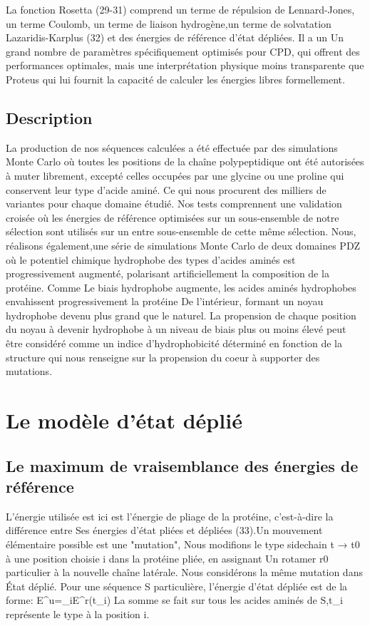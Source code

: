 La fonction Rosetta (29-31) comprend un terme de répulsion de Lennard-Jones, un terme Coulomb, un terme de liaison hydrogène,un terme de solvatation Lazaridis-Karplus (32) et des énergies de référence d'état dépliées. Il a un
Un grand nombre de paramètres spécifiquement optimisés pour CPD, qui offrent des performances optimales, mais une interprétation physique moins transparente que Proteus qui lui fournit la capacité de calculer les énergies libres formellement.

\subsection{Description}
La production de nos séquences calculées a été effectuée par des simulations Monte Carlo où toutes les positions de la chaîne polypeptidique ont été autorisées à muter librement, excepté celles occupées par une glycine ou une proline qui conservent leur type d'acide aminé. Ce qui nous procurent des milliers de variantes pour chaque domaine étudié. Nos tests comprennent une validation croisée où les énergies de référence optimisées sur un sous-ensemble de notre sélection sont utilisés sur un entre sous-ensemble de cette même sélection. Nous, réalisons également,une série de simulations Monte Carlo de deux domaines PDZ où le potentiel chimique hydrophobe des types d'acides aminés est progressivement augmenté, polarisant artificiellement la composition de la protéine. Comme Le biais hydrophobe augmente, les acides aminés hydrophobes envahissent progressivement  la protéine
De l'intérieur, formant un noyau hydrophobe devenu plus grand que le naturel.
La propension de chaque position du noyau à devenir hydrophobe à un niveau de biais plus ou moins élevé peut être considéré comme un indice d'hydrophobicité déterminé en fonction de la structure qui nous renseigne sur la propension du coeur à supporter des mutations.

\section{Le modèle d'état déplié}
\subsection{Le maximum de vraisemblance des énergies de référence}

L'énergie utilisée est ici est l'énergie de pliage de la protéine, c'est-à-dire la différence entre
Ses énergies d'état pliées et dépliées (33).Un mouvement élémentaire possible est une "mutation",
Nous modifions le type sidechain t → t0 à une position choisie i dans la protéine pliée, en assignant
Un rotamer r0 particulier à la nouvelle chaîne latérale. Nous considérons la même mutation dans
État déplié. Pour une séquence S particulière, l'énergie d'état dépliée est de la forme:
E^u=\sum_{i\inS}E^r(t_i)
La somme se fait sur tous les acides aminés de S,t_i représente le type  à la position i.

